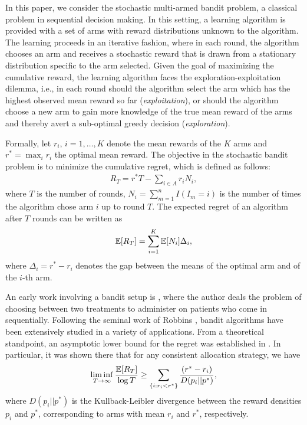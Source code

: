 In this paper, we consider the stochastic multi-armed bandit problem, a classical problem in sequential decision making. In this setting,  a learning algorithm is provided with a set of arms with reward distributions unknown to the algorithm. The learning proceeds in an iterative fashion, where in each round, the algorithm chooses an arm and receives a stochastic reward that is drawn from a stationary distribution specific to the arm selected.  
Given the goal of maximizing the cumulative reward, the learning algorithm faces the exploration-exploitation dilemma, i.e., in each round should the algorithm select the arm which has the highest observed mean reward so far 
(\textit{exploitation}), or should the algorithm choose a new arm to gain more knowledge of the true mean reward of the arms and thereby avert a sub-optimal greedy decision (\textit{exploration}). 

Formally, let $r_i$, $i=1,\ldots,K$ denote the mean rewards of the $K$ arms and $r^* = \max_i r_i$ the optimal mean reward. The objective in the stochastic bandit problem is to minimize the cumulative regret, which is defined as follows:
\begin{align*}
R_{T}=r^{*}T - \sum_{i\in A} r_{i}N_{i},
\end{align*}
where $T$ is the number of rounds, $N_{i}=\sum_{m=1}^n I(I_m=i)$ is the number of times the algorithm chose arm $i$ up to round $T$.
The expected regret of an algorithm after $T$ rounds can be written as
\begin{align*}
\mathbb{E}[R_{T}]= \sum_{i=1}^K \mathbb{E}[N_i] \Delta_i,
\end{align*}
where $\Delta_{i}=r^{*}-r_{i}$ denotes the gap between the means of the optimal arm and of the $i$-th arm. 


                                                                                                                                          


An early work involving a bandit setup is \cite{thompson1933likelihood}, where the author deals the problem of choosing between two treatments to administer on patients who come in sequentially. Following the seminal work of Robbins \cite{robbins1952some}, bandit algorithms have been extensively studied in a variety of applications. 
From a theoretical standpoint, an asymptotic lower bound for the regret was established in \cite{lai1985asymptotically}. In particular, it was shown there that for any consistent allocation strategy, we have
$$\liminf_{T \to \infty}\frac{\mathbb{E}[R_{T}]}{\log T}\geq\sum_{\{i:r_{i}<r^{*}\}}\dfrac{(r^{*}-r_{i})}{D(p_{i}||p^{*})},$$
where $D(p_{i}||p^{*})$ is the Kullback-Leibler divergence between the reward densities $p_{i}$ and $p^{*}$, corresponding to arms with mean $r_{i}$ and $r^{*}$, respectively.

